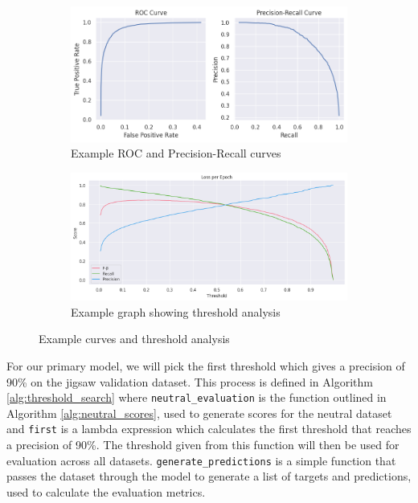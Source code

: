 \begin{figure}
    \centering
    \begin{subfigure}[b]{0.6\textwidth}
        \includegraphics[width=\textwidth]{graphs/curves.png}
        \caption{Example ROC and Precision-Recall curves}
        \label{subfig:curves}
    \end{subfigure}

    \begin{subfigure}[b]{0.75\textwidth}
        \includegraphics[width=\textwidth]{graphs/training/example_curves.png}
        \caption{Example graph showing threshold analysis}
        \label{subfig:threshold}
    \end{subfigure}
    \caption{Example curves and threshold analysis}
    \label{fig:combined}
\end{figure}

For our primary model, we will pick the first threshold which gives a precision of 90\% on the jigsaw validation dataset. This process is defined in Algorithm \ref{alg:threshold_search} where \verb|neutral_evaluation| is the function outlined in Algorithm \ref{alg:neutral_scores}, used to generate scores for the neutral dataset and \verb|first| is a lambda expression which calculates the first threshold that reaches a precision of 90\%. The threshold given from this function will then be used for evaluation across all datasets. \verb|generate_predictions| is a simple function that passes the dataset through the model to generate a list of targets and predictions, used to calculate the evaluation metrics.

